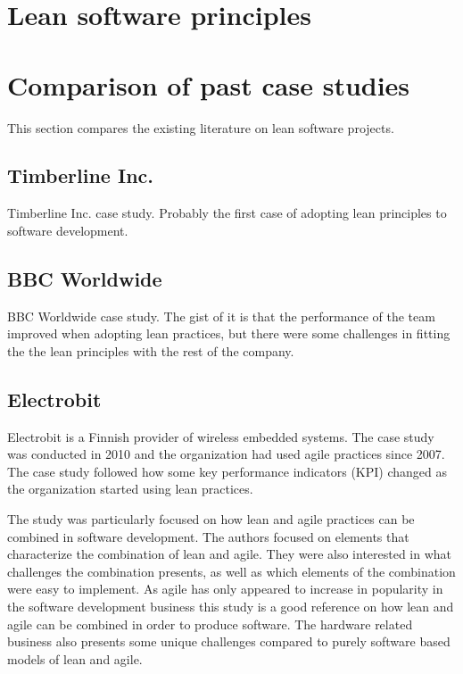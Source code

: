 \section{Lean software principles}
\label{section:leansoftwareprinciples}


\section{Comparison of past case studies}
\label{section:pastleanprojects}

This section compares the existing literature on lean software projects.\\


\subsection{Timberline Inc.}
\label{timberline}

Timberline Inc. case study. Probably the first case of adopting lean principles to software development.\cite{Middleton2005Lean}


\subsection{BBC Worldwide}
\label{bbc}

BBC Worldwide case study. The gist of it is that the performance of the team improved when adopting lean practices, but there were some challenges in fitting the the lean principles with the rest of the company.\cite{Middleton2012Lean}


\subsection{Electrobit}
\label{finnishprovider}

Electrobit is a Finnish provider of wireless embedded systems. The case study was conducted in 2010 and the organization had used agile practices since 2007. The case study followed how some key performance indicators (KPI) changed as the organization started using lean practices. \cite{Rodriguez2014Combining}

The study was particularly focused on how lean and agile practices can be combined in software development. The authors focused on elements that characterize the combination of lean and agile. They were also interested in what challenges the combination presents, as well as which elements of the combination were easy to implement.\cite{Rodriguez2014Combining} As agile has only appeared to increase in popularity in the software development business this study is a good reference on how lean and agile can be combined in order to produce software. The hardware related business also presents some unique challenges compared to purely software based models of lean and agile.


